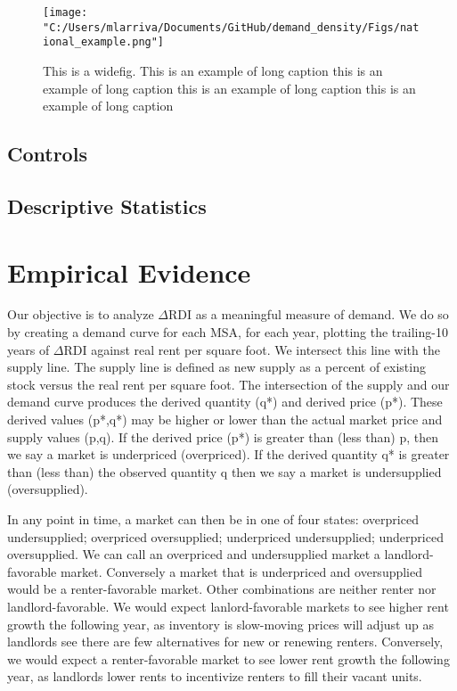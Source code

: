 \documentclass[sn-mathphys-num]{sn-jnl}%
\theoremstyle{thmstyleone}%
\theoremstyle{thmstyletwo}%
\theoremstyle{thmstylethree}%
\begin{document}
\begin{figure}[H]
	\centering
	\texttt{[image: "C:/Users/mlarriva/Documents/GitHub/demand\_density/Figs/national\_example.png"]}
	\caption{This is a widefig. This is an example of long caption this is an example of long caption  this is an example of long caption this is an example of long caption}\label{fig4}
\end{figure}
\subsection{Controls}
\subsection{Descriptive Statistics}


\section{Empirical Evidence}\label{sec2}
Our objective is to analyze $\Delta\text{RDI}$ as a meaningful measure of demand. We do so by creating a demand curve for each MSA, for each year, plotting the trailing-10 years of $\Delta\text{RDI}$ against real rent per square foot. We intersect this line with the supply line. The supply line is defined as new supply as a percent of existing stock versus the real rent per square foot. The intersection of the supply and our demand curve produces the derived quantity (q*) and derived price (p*). These derived values (p*,q*) may be higher or lower than the actual market price and supply values (p,q). If the derived price (p*) is greater than (less than) p, then we say a market is underpriced (overpriced). If the derived quantity q* is greater than (less than) the observed quantity q then we say a market is undersupplied (oversupplied).

In any point in time, a market can then be in one of four states: overpriced undersupplied; overpriced oversupplied; underpriced undersupplied; underpriced oversupplied. We can call an overpriced and undersupplied market a landlord-favorable market. Conversely a market that is underpriced and oversupplied would be a renter-favorable market. Other combinations are neither renter nor landlord-favorable. We would expect lanlord-favorable markets to see higher rent growth the following year, as inventory is slow-moving prices will adjust up as landlords see there are few alternatives for new or renewing renters. Conversely, we would expect a renter-favorable market to see lower rent growth the following year, as landlords lower rents to incentivize renters to fill their vacant units. 
\end{document}
